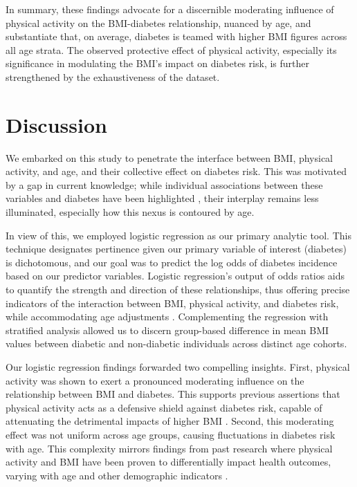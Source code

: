 \documentclass[11pt]{article}
\begin{document}
In summary, these findings advocate for a discernible moderating influence of physical activity on the BMI-diabetes relationship, nuanced by age, and substantiate that, on average, diabetes is teamed with higher BMI figures across all age strata. The observed protective effect of physical activity, especially its significance in modulating the BMI's impact on diabetes risk, is further strengthened by the exhaustiveness of the dataset.

\section*{Discussion}

We embarked on this study to penetrate the interface between BMI, physical activity, and age, and their collective effect on diabetes risk. This was motivated by a gap in current knowledge; while individual associations between these variables and diabetes have been highlighted \cite{Chan1994ObesityFD, Singh2013TheAQ, Bohn2015ImpactOP, Wahid2016QuantifyingTA}, their interplay remains less illuminated, especially how this nexus is contoured by age.

In view of this, we employed logistic regression as our primary analytic tool. This technique designates pertinence given our primary variable of interest (diabetes) is dichotomous, and our goal was to predict the log odds of diabetes incidence based on our predictor variables. Logistic regression's output of odds ratios aids to quantify the strength and direction of these relationships, thus offering precise indicators of the interaction between BMI, physical activity, and diabetes risk, while accommodating age adjustments \cite{Menard1996AppliedLR}. Complementing the regression with stratified analysis allowed us to discern group-based difference in mean BMI values between diabetic and non-diabetic individuals across distinct age cohorts.

Our logistic regression findings forwarded two compelling insights. First, physical activity was shown to exert a pronounced moderating influence on the relationship between BMI and diabetes. This supports previous assertions that physical activity acts as a defensive shield against diabetes risk, capable of attenuating the detrimental impacts of higher BMI \cite{Mao2022PhysicalAR, Park2014GenderDI}. Second, this moderating effect was not uniform across age groups, causing fluctuations in diabetes risk with age. This complexity mirrors findings from past research where physical activity and BMI have been proven to differentially impact health outcomes, varying with age and other demographic indicators \cite{Richard2017LonelinessIA, Kriska1990DevelopmentOQ}.
\end{document}

